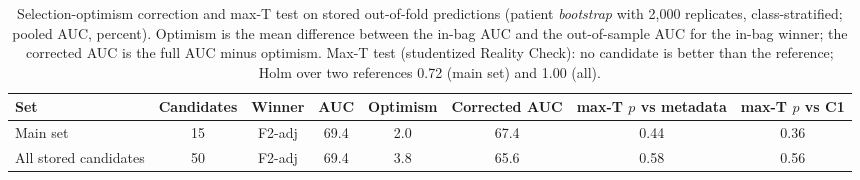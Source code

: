 \begin{table}[t]
\caption{Selection-optimism correction and max-T test on stored out-of-fold predictions (patient \textit{bootstrap} with 2,000 replicates, class-stratified; pooled AUC, percent). Optimism is the mean difference between the in-bag AUC and the out-of-sample AUC for the in-bag winner; the corrected AUC is the full AUC minus optimism. Max-T test (studentized Reality Check): no candidate is better than the reference; Holm over two references 0.72 (main set) and 1.00 (all).}\label{tab:optimisme}
\centering\scriptsize
\setlength{\tabcolsep}{2pt}
\begin{tabular}{p{}ccccccc}
\toprule
Set & Candidates & Winner & AUC & Optimism & Corrected AUC & max-T $p$ vs metadata & max-T $p$ vs C1 \\
\midrule
Main set & 15 & F2-adj & 69.4 & 2.0 & 67.4 & 0.44 & 0.36 \\
All stored candidates & 50 & F2-adj & 69.4 & 3.8 & 65.6 & 0.58 & 0.56 \\
\bottomrule
\end{tabular}
\end{table}
